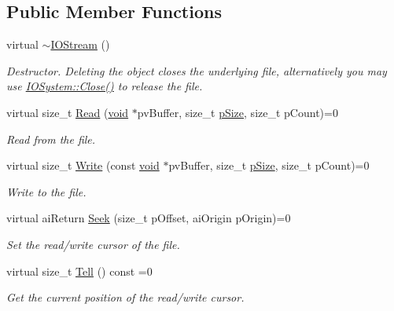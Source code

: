 \subsection*{Public Member Functions}
\begin{DoxyCompactItemize}
\item 
virtual \hyperlink{class_assimp_1_1_i_o_stream_a6cedc5033bf531bf14b97d1c9b788de8}{$\sim$\-I\-O\-Stream} ()
\begin{DoxyCompactList}\small\item\em Destructor. Deleting the object closes the underlying file, alternatively you may use \hyperlink{class_assimp_1_1_i_o_system_a8c334d60f04bceeb6bd0157d21723f3e}{I\-O\-System\-::\-Close()} to release the file. \end{DoxyCompactList}\item 
virtual size\-\_\-t \hyperlink{class_assimp_1_1_i_o_stream_ae376f641020989d61863b9c6f55c7abf}{Read} (\hyperlink{wglew_8h_aeea6e3dfae3acf232096f57d2d57f084}{void} $\ast$pv\-Buffer, size\-\_\-t \hyperlink{wglew_8h_a95e478a19268863e38a9733ac885ac14}{p\-Size}, size\-\_\-t p\-Count)=0
\begin{DoxyCompactList}\small\item\em Read from the file. \end{DoxyCompactList}\item 
virtual size\-\_\-t \hyperlink{class_assimp_1_1_i_o_stream_ad0ca4aae1b8c4d00db391ac3a4171f7b}{Write} (const \hyperlink{wglew_8h_aeea6e3dfae3acf232096f57d2d57f084}{void} $\ast$pv\-Buffer, size\-\_\-t \hyperlink{wglew_8h_a95e478a19268863e38a9733ac885ac14}{p\-Size}, size\-\_\-t p\-Count)=0
\begin{DoxyCompactList}\small\item\em Write to the file. \end{DoxyCompactList}\item 
virtual ai\-Return \hyperlink{class_assimp_1_1_i_o_stream_a5ed0dddf418ab08cf3fc21f3f3032220}{Seek} (size\-\_\-t p\-Offset, ai\-Origin p\-Origin)=0
\begin{DoxyCompactList}\small\item\em Set the read/write cursor of the file. \end{DoxyCompactList}\item 
virtual size\-\_\-t \hyperlink{class_assimp_1_1_i_o_stream_a316ac6cd16b5a493d1313f792c806194}{Tell} () const =0
\begin{DoxyCompactList}\small\item\em Get the current position of the read/write cursor. \end{DoxyCompactList}\item 

\end{DoxyCompactItemize}
